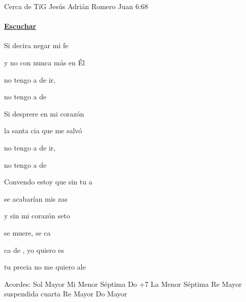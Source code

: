 \documentclass[12pt, spanish]{book}
\newcommand{\NotCCLIed}{\relax}
\begin{document}
    \begin{song}{Cerca de Tí}{G}
    {} %
    {Jesús Adrián Romero}
    {Juan 6:68} %
    {} %
        \ifChordBk
        \paragraph{\mbox{}\hfill\protect\href{https://open.spotify.com/intl-es/track/6waY2sAiBJzHdmXyKYmr1w}{Escuchar}\mbox{}\hfill}
        \fi


        \begin{SBOpGroup}
            Si decira negar mi fe

            y no con nunca más en Él

            no tengo a de ir,

            no tengo a de 
        \end{SBOpGroup}
        \vskip 20pt
        \begin{SBOpGroup}
            Si desprere en mi corazón

            la santa cia que me salvó

            no tengo a de ir,

            no tengo a de 
        \end{SBOpGroup}
        \vskip 20pt
        \begin{SBOpGroup}
            Convendo estoy que sin tu a

            se acabarían mis zas

            y sin  mi corazón seto

            se muere, se ca 
        \end{SBOpGroup}
        \vskip 20pt
        \begin{SBOpGroup}
            ca de , yo quiero es

             tu precia no me quiero ale
        \end{SBOpGroup}

        \ifChordBk
        \begin{SBOpGroup}
            Acordes:\break
            \upchord{\G}\qquad Sol Mayor \hfill
            \upchord{\Emseven}\qquad Mi Menor S\'eptima \hfill\null\break
            \upchord{\CMaj}\qquad Do +7 \hfill
            \upchord{\Amseven}\qquad La Menor S\'eptima \hfill\null\break
            \upchord{\Dsus}\qquad Re Mayor suspendida cuarta \hfill
            \upchord{\D}\qquad Re Mayor \hfill\null\break
            \upchord{\C}\qquad Do Mayor \hfill
        \end{SBOpGroup}
        \fi
    \end{song}
\end{document}
